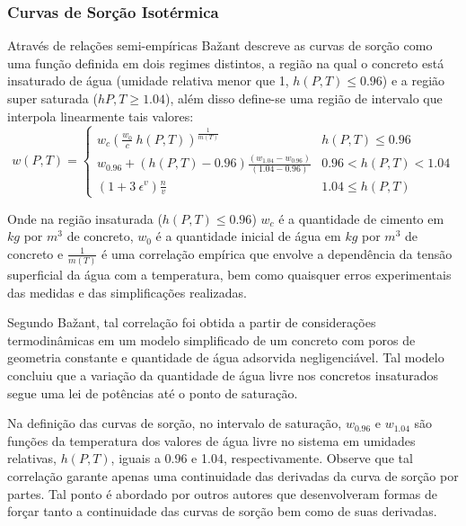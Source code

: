     \subsubsection{Curvas de Sorção Isotérmica}
    Através de relações semi-empíricas Ba\v{z}ant descreve as curvas de sorção
    como uma função definida em dois regimes distintos, a região na qual o
    concreto está insaturado de água (umidade relativa menor que 1, $h(P, T) \leq 0.96$)
    e a região super saturada ($h{P,T} \geq 1.04$), além disso define-se uma região de
    intervalo que interpola linearmente tais valores:
    \begin{equation}
      \label{eq:baz_phi}
      w(P, T) =
      \begin{cases} 
      w_c \left( \frac{w_0}{c} \ h(P,T) \right)^{\frac{1}{m(T)}} & h(P, T)\leq 0.96 \\
      w_{0.96} + (h(P, T) - 0.96) \frac{(w_{1.04} - w_{0.96})}{(1.04-0.96)} & 0.96 < h(P, T) < 1.04 \\
      (1 + 3 \ \epsilon^v)\frac{n}{v} & 1.04\leq h(P, T) 
      \end{cases}
    \end{equation}
    
    Onde na região insaturada ($h(P, T) \leq 0.96$) $w_c$ é a quantidade de
    cimento em $kg$ por $m^3$ de concreto, $w_0$ é a quantidade inicial de água em $kg$
    por $m^3$ de concreto e $\frac{1}{m(T)}$ é uma correlação empírica que
    envolve a dependência da tensão superficial da água com a temperatura, bem
    como quaisquer erros experimentais das medidas e das simplificações
    realizadas.

    Segundo Ba\v{z}ant, tal correlação foi obtida a partir de considerações
    termodinâmicas em um modelo simplificado de um concreto com poros de geometria
    constante e quantidade de água adsorvida negligenciável. Tal modelo concluiu
    que a variação da quantidade de água livre nos concretos insaturados segue
    uma lei de potências até o ponto de saturação.

    Na definição das curvas de sorção, no intervalo de saturação, $w_{0.96}$ e
    $w_{1.04}$ são funções da temperatura dos valores de água livre no sistema
    em umidades relativas, $h(P, T)$, iguais a 0.96 e 1.04, respectivamente.
    Observe que tal correlação garante apenas uma continuidade das derivadas da
    curva de sorção por partes. Tal ponto é abordado por outros autores que
    desenvolveram formas de forçar tanto a continuidade das curvas de sorção bem
    como de suas derivadas.

